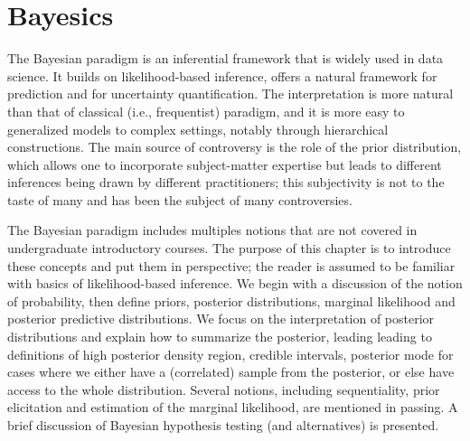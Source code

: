 \documentclass[
  11pt,
  letterpaper,
]{scrbook}
\theoremstyle{definition}
\theoremstyle{plain}
\theoremstyle{plain}
\theoremstyle{plain}
\theoremstyle{definition}
\theoremstyle{definition}
\theoremstyle{plain}
\theoremstyle{plain}
\theoremstyle{remark}
\begin{document}

\chapter{Bayesics}\label{bayesics}

The Bayesian paradigm is an inferential framework that is widely used in
data science. It builds on likelihood-based inference, offers a natural
framework for prediction and for uncertainty quantification. The
interpretation is more natural than that of classical (i.e.,
frequentist) paradigm, and it is more easy to generalized models to
complex settings, notably through hierarchical constructions. The main
source of controversy is the role of the prior distribution, which
allows one to incorporate subject-matter expertise but leads to
different inferences being drawn by different practitioners; this
subjectivity is not to the taste of many and has been the subject of
many controversies.

The Bayesian paradigm includes multiples notions that are not covered in
undergraduate introductory courses. The purpose of this chapter is to
introduce these concepts and put them in perspective; the reader is
assumed to be familiar with basics of likelihood-based inference. We
begin with a discussion of the notion of probability, then define
priors, posterior distributions, marginal likelihood and posterior
predictive distributions. We focus on the interpretation of posterior
distributions and explain how to summarize the posterior, leading
leading to definitions of high posterior density region, credible
intervals, posterior mode for cases where we either have a (correlated)
sample from the posterior, or else have access to the whole
distribution. Several notions, including sequentiality, prior
elicitation and estimation of the marginal likelihood, are mentioned in
passing. A brief discussion of Bayesian hypothesis testing (and
alternatives) is presented.
\end{document}

